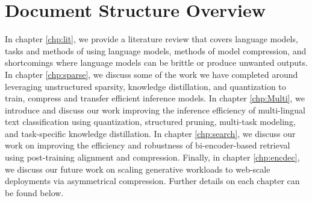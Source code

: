\section{Document Structure Overview}
In chapter \ref{chp:lit}, we provide a literature review that covers language models, tasks and methods of using language models, methods of model compression, and shortcomings where language models can be brittle or produce unwanted outputs. In chapter \ref{chp:sparse}, we discuss some of the work we have completed around leveraging unstructured sparsity, knowledge distillation, and quantization to train, compress and transfer efficient inference models. In chapter \ref{chp:Multi}, we introduce and discuss our work improving the inference efficiency of multi-lingual text classification using quantization, structured pruning, multi-task modeling, and task-specific knowledge distillation. In chapter \ref{chp:search}, we discuss our work on improving the efficiency and robustness of bi-encoder-based retrieval using post-training alignment and compression. Finally, in chapter \ref{chp:encdec}, we discuss our future work on scaling generative workloads to web-scale deployments via asymmetrical compression. Further details on each chapter can be found below. 